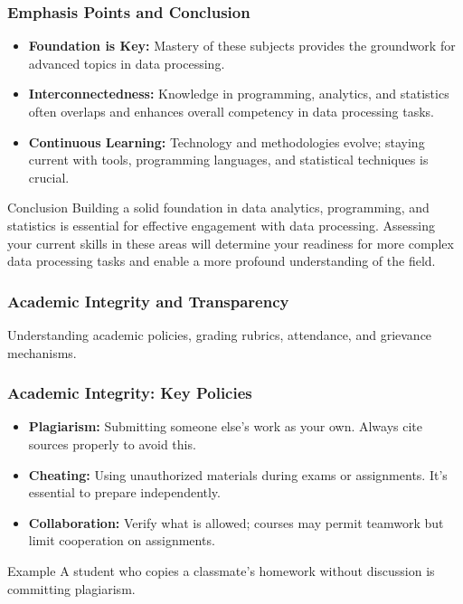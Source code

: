 \documentclass[aspectratio=169]{beamer}
\begin{document}
\begin{frame}[fragile]
    \frametitle{Emphasis Points and Conclusion}
    \begin{itemize}
        \item \textbf{Foundation is Key:} Mastery of these subjects provides the groundwork for advanced topics in data processing.
        \item \textbf{Interconnectedness:} Knowledge in programming, analytics, and statistics often overlaps and enhances overall competency in data processing tasks.
        \item \textbf{Continuous Learning:} Technology and methodologies evolve; staying current with tools, programming languages, and statistical techniques is crucial.
    \end{itemize}
    \begin{block}{Conclusion}
        Building a solid foundation in data analytics, programming, and statistics is essential for effective engagement with data processing. 
        Assessing your current skills in these areas will determine your readiness for more complex data processing tasks and enable a more profound understanding of the field.
    \end{block}
\end{frame}

\begin{frame}[fragile]
    \frametitle{Academic Integrity and Transparency}
    Understanding academic policies, grading rubrics, attendance, and grievance mechanisms.
\end{frame}

\begin{frame}[fragile]
    \frametitle{Academic Integrity: Key Policies}
    \begin{itemize}
        \item \textbf{Plagiarism:} Submitting someone else’s work as your own. Always cite sources properly to avoid this.
        \item \textbf{Cheating:} Using unauthorized materials during exams or assignments. It’s essential to prepare independently.
        \item \textbf{Collaboration:} Verify what is allowed; courses may permit teamwork but limit cooperation on assignments.
    \end{itemize}
    \begin{block}{Example}
        A student who copies a classmate's homework without discussion is committing plagiarism.
    \end{block}
\end{frame}
\end{document}
